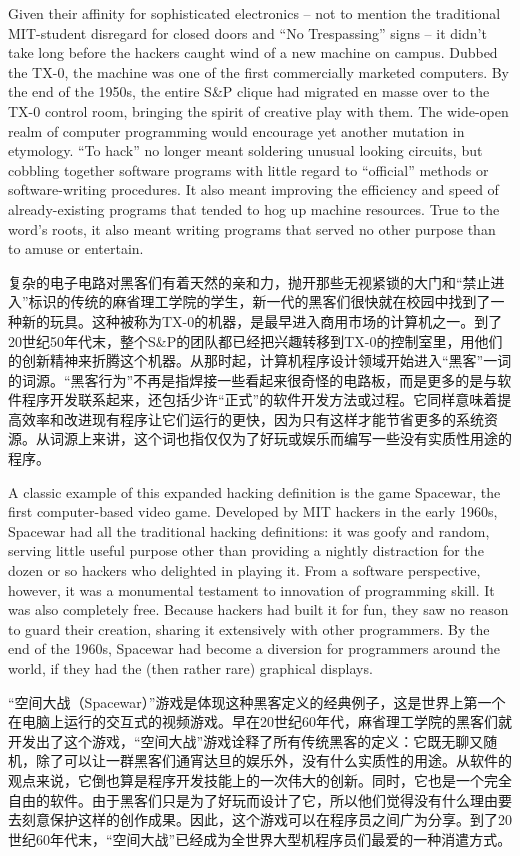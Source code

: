 \ifdefined\eng
Given their affinity for sophisticated electronics -- not to mention the traditional MIT-student disregard for closed doors and ``No Trespassing'' signs -- it didn't take long before the hackers caught wind of a new machine on campus. Dubbed the TX-0, the machine was one of the first commercially marketed computers. By the end of the 1950s, the entire S\&P clique had migrated en masse over to the TX-0 control room, bringing the spirit of creative play with them. The wide-open realm of computer programming would encourage yet another mutation in etymology. ``To hack'' no longer meant soldering unusual looking circuits, but cobbling together software programs with little regard to ``official'' methods or software-writing procedures. It also meant improving the efficiency and speed of already-existing programs that tended to hog up machine resources. True to the word's roots, it also meant writing programs that served no other purpose than to amuse or entertain.
\fi

\ifdefined\chs
复杂的电子电路对黑客们有着天然的亲和力，抛开那些无视紧锁的大门和“禁止进入”标识的传统的麻省理工学院的学生，新一代的黑客们很快就在校园中找到了一种新的玩具。这种被称为TX-0的机器，是最早进入商用市场的计算机之一。到了20世纪50年代末，整个S\&P的团队都已经把兴趣转移到TX-0的控制室里，用他们的创新精神来折腾这个机器。从那时起，计算机程序设计领域开始进入“黑客”一词的词源。“黑客行为”不再是指焊接一些看起来很奇怪的电路板，而是更多的是与软件程序开发联系起来，还包括少许“正式”的软件开发方法或过程。它同样意味着提高效率和改进现有程序让它们运行的更快，因为只有这样才能节省更多的系统资源。从词源上来讲，这个词也指仅仅为了好玩或娱乐而编写一些没有实质性用途的程序。
\fi

\ifdefined\eng
A classic example of this expanded hacking definition is the game Spacewar, the first computer-based video game. Developed by MIT hackers in the early 1960s, Spacewar had all the traditional hacking definitions: it was goofy and random, serving little useful purpose other than providing a nightly distraction for the dozen or so hackers who delighted in playing it. From a software perspective, however, it was a monumental testament to innovation of programming skill. It was also completely free. Because hackers had built it for fun, they saw no reason to guard their creation, sharing it extensively with other programmers. By the end of the 1960s, Spacewar had become a diversion for programmers around the world, if they had the (then rather rare) graphical displays.
\fi

\ifdefined\chs
“空间大战（Spacewar）”游戏是体现这种黑客定义的经典例子，这是世界上第一个在电脑上运行的交互式的视频游戏。早在20世纪60年代，麻省理工学院的黑客们就开发出了这个游戏，“空间大战”游戏诠释了所有传统黑客的定义：它既无聊又随机，除了可以让一群黑客们通宵达旦的娱乐外，没有什么实质性的用途。从软件的观点来说，它倒也算是程序开发技能上的一次伟大的创新。同时，它也是一个完全自由的软件。由于黑客们只是为了好玩而设计了它，所以他们觉得没有什么理由要去刻意保护这样的创作成果。因此，这个游戏可以在程序员之间广为分享。到了20世纪60年代末，“空间大战”已经成为全世界大型机程序员们最爱的一种消遣方式。
\fi

